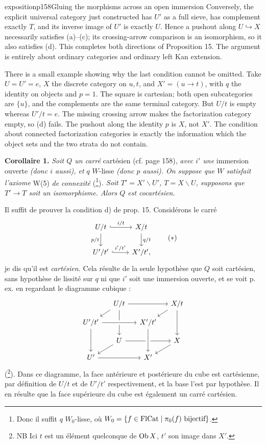 \begin{dcomment}{exposition}{p158}{Gluing the morphisms across an open immersion}
Conversely, the explicit universal category just constructed has $U'$ as a full sieve, has complement exactly $T$, and its inverse image of $U'$ is exactly $U$. Hence a pushout along $U\hookrightarrow X$ necessarily satisfies (a)--(c); its crossing-arrow comparison is an isomorphism, so it also satisfies (d). This completes both directions of Proposition 15. The argument is entirely about ordinary categories and ordinary left Kan extension.

There is a small example showing why the last condition cannot be omitted. Take $U=U'=e$, $X$ the discrete category on $u,t$, and $X'=(u\to t)$, with $q$ the identity on objects and $p=1$. The square is cartesian; both open subcategories are $\{u\}$, and the complements are the same terminal category. But $U/t$ is empty whereas $U'/t=e$. The missing crossing arrow makes the factorization category empty, so (d) fails. The pushout along the identity $p$ is $X$, not $X'$. The condition about connected factorization categories is exactly the information which the object sets and the two strata do not contain.
\end{dcomment}


\textbf{Corollaire 1.} \textit{Soit $Q$ un carré} cartésien (cf. page 158), \textit{avec $i'$ une} immersion ouverte \textit{(donc $i$ aussi), et $q$} $W$-lisse \textit{(donc $p$ aussi). On suppose que $W$ satisfait l'axiome} W(5) \textit{de connexité} (\footnote[109]{Donc il suffit $q$ $W_0$-lisse, où $W_0 = \{f \in \mathrm{Fl} \mathrm{Cat} \mid \pi_0(f) \text{ bijectif}\}$.})\textit{. Soit $T' = X' \backslash U'$, $T = X \backslash U$, supposons que $T' \longrightarrow T$ soit un isomorphisme. Alors $Q$ est cocartésien.}

Il suffit de prouver la condition d) de prop. 15. Considérons le carré
\[
\begin{tikzcd}
U/t \ar[r, hook, "i/t"] \ar[d, "p/t"'] & X/t \ar[d, "q/t"] \\
U'/t' \ar[r, hook, "i'/t'"] & X'/t',
\end{tikzcd}
\tag*{$(*)$}
\]
je dis qu'il est \textit{cartésien.} Cela résulte de la seule hypothèse que $Q$ soit cartésien, sans hypothèse de lissité sur $q$ ni que $i'$ soit une immersion ouverte, et se voit p. ex. en regardant le diagramme cubique :
\[
\begin{tikzcd}[row sep=small, column sep=small]
& U/t \ar[rr] \ar[dl] \ar[dd] & & X/t \ar[dl] \ar[dd] \\
U'/t' \ar[rr, crossing over] \ar[dd] & & X'/t' & \\
& U \ar[rr] \ar[dl] & & X \ar[dl] \\
U' \ar[rr] & & X' \ar[from=uu, crossing over] &
\end{tikzcd}
\]
(\footnote[110]{NB Ici $t$ est un élément quelconque de $\operatorname{Ob} X$, $t'$ son image dans $X'$.}). Dans ce diagramme, la face antérieure et postérieure du cube est cartésienne, par définition de $U/t$ et de $U'/t'$
respectivement, et la base l'est par hypothèse. Il en résulte que la face supérieure du cube est également un carré cartésien.

